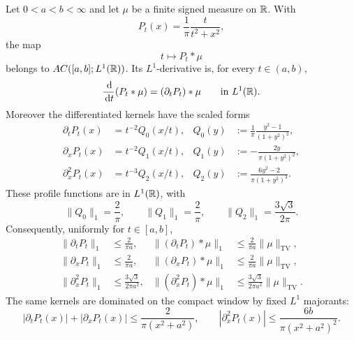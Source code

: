 \begin{lemma}%
\label{lem:poisson-kernel-l1-ac-bounds}
Let \(0<a<b<\infty\) and let \(\mu\) be a finite signed measure on
\(\mathbb{R}\).  With
\[
P_t(x)=\frac1\pi\frac{t}{t^2+x^2},
\]
the map
\[
t\longmapsto P_t*\mu
\]
belongs to \(AC([a,b];L^1(\mathbb{R}))\).  Its \(L^1\)-derivative is, for every
\(t\in(a,b)\),
\begin{equation}\label{eq:poisson-convolution-time-derivative-l1}
\frac{\,\mathrm{d}}{\,\mathrm{d} t}(P_t*\mu)=(\partial_tP_t)*\mu
\qquad\text{in }L^1(\mathbb{R}).
\end{equation}
Moreover the differentiated kernels have the scaled forms
\begin{align}
\partial_tP_t(x)&=t^{-2}Q_0(x/t),
&Q_0(y)&:=\frac1\pi\frac{y^2-1}{(1+y^2)^2}, \label{eq:poisson-Qt-scaled}\\
\partial_xP_t(x)&=t^{-2}Q_1(x/t),
&Q_1(y)&:=-\frac{2y}{\pi(1+y^2)^2}, \label{eq:poisson-Qx-scaled}\\
\partial_x^2P_t(x)&=t^{-3}Q_2(x/t),
&Q_2(y)&:=\frac{6y^2-2}{\pi(1+y^2)^3}. \label{eq:poisson-Qxx-scaled}
\end{align}
These profile functions are in \(L^1(\mathbb{R})\), with
\begin{equation}\label{eq:poisson-Q-profile-l1-norms}
\|Q_0\|_1=\frac2\pi,\qquad
\|Q_1\|_1=\frac2\pi,\qquad
\|Q_2\|_1=\frac{3\sqrt3}{2\pi}.
\end{equation}
Consequently, uniformly for \(t\in[a,b]\),
\begin{align}
\|\partial_tP_t\|_1&\le \frac{2}{\pi a},
&
\|(\partial_tP_t)*\mu\|_1&\le \frac{2}{\pi a}\|\mu\|_{\mathrm{TV}},
\label{eq:poisson-dt-uniform-l1-bound}\\
\|\partial_xP_t\|_1&\le \frac{2}{\pi a},
&
\|(\partial_xP_t)*\mu\|_1&\le \frac{2}{\pi a}\|\mu\|_{\mathrm{TV}},
\label{eq:poisson-dx-uniform-l1-bound}\\
\|\partial_x^2P_t\|_1&\le \frac{3\sqrt3}{2\pi a^2},
&
\|(\partial_x^2P_t)*\mu\|_1&\le
\frac{3\sqrt3}{2\pi a^2}\|\mu\|_{\mathrm{TV}}.
\label{eq:poisson-dxx-uniform-l1-bound}
\end{align}
The same kernels are dominated on the compact window by fixed \(L^1\)
majorants:
\begin{equation}\label{eq:poisson-derivative-pointwise-majorants}
|\partial_tP_t(x)|+|\partial_xP_t(x)|
\le \frac{2}{\pi(x^2+a^2)},\qquad
|\partial_x^2P_t(x)|
\le \frac{6b}{\pi(x^2+a^2)^2}.
\end{equation}
\end{lemma}

